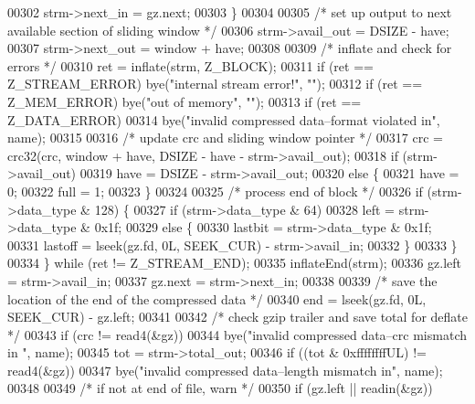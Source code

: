 \begin{DoxyCode}
{00302             strm->next\_in = gz.next;
00303         \}
00304 
00305         \textcolor{comment}{/* set up output to next available section of sliding window */}
00306         strm->avail\_out = DSIZE - have;
00307         strm->next\_out = window + have;
00308 
00309         \textcolor{comment}{/* inflate and check for errors */}
00310         ret = inflate(strm, Z\_BLOCK);
00311         \textcolor{keywordflow}{if} (ret == Z\_STREAM\_ERROR) bye(\textcolor{stringliteral}{"internal stream error!"}, \textcolor{stringliteral}{""});
00312         \textcolor{keywordflow}{if} (ret == Z\_MEM\_ERROR) bye(\textcolor{stringliteral}{"out of memory"}, \textcolor{stringliteral}{""});
00313         \textcolor{keywordflow}{if} (ret == Z\_DATA\_ERROR)
00314             bye(\textcolor{stringliteral}{"invalid compressed data--format violated in"}, name);
00315 
00316         \textcolor{comment}{/* update crc and sliding window pointer */}
00317         crc = crc32(crc, window + have, DSIZE - have - strm->avail\_out);
00318         \textcolor{keywordflow}{if} (strm->avail\_out)
00319             have = DSIZE - strm->avail\_out;
00320         \textcolor{keywordflow}{else} \{
00321             have = 0;
00322             full = 1;
00323         \}
00324 
00325         \textcolor{comment}{/* process end of block */}
00326         \textcolor{keywordflow}{if} (strm->data\_type & 128) \{
00327             \textcolor{keywordflow}{if} (strm->data\_type & 64)
00328                 left = strm->data\_type & 0x1f;
00329             \textcolor{keywordflow}{else} \{
00330                 lastbit = strm->data\_type & 0x1f;
00331                 lastoff = lseek(gz.fd, 0L, SEEK\_CUR) - strm->avail\_in;
00332             \}
00333         \}
00334     \} \textcolor{keywordflow}{while} (ret != Z\_STREAM\_END);
00335     inflateEnd(strm);
00336     gz.left = strm->avail\_in;
00337     gz.next = strm->next\_in;
00338 
00339     \textcolor{comment}{/* save the location of the end of the compressed data */}
00340     end = lseek(gz.fd, 0L, SEEK\_CUR) - gz.left;
00341 
00342     \textcolor{comment}{/* check gzip trailer and save total for deflate */}
00343     \textcolor{keywordflow}{if} (crc != read4(&gz))
00344         bye(\textcolor{stringliteral}{"invalid compressed data--crc mismatch in "}, name);
00345     tot = strm->total\_out;
00346     \textcolor{keywordflow}{if} ((tot & 0xffffffffUL) != read4(&gz))
00347         bye(\textcolor{stringliteral}{"invalid compressed data--length mismatch in"}, name);
00348 
00349     \textcolor{comment}{/* if not at end of file, warn */}
00350     \textcolor{keywordflow}{if} (gz.left || readin(&gz))
}
\end{DoxyCode}
